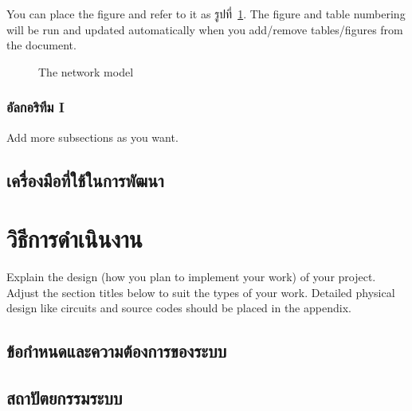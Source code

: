 \documentclass[12pt,oneside,openright,a4paper]{cpe-thai-project}
\begin{document}
You can place the figure and refer to it as รูปที่~\ref{fig:model2}.
The figure and table numbering will be run and updated automatically when you add/remove tables/figures from the document.

\begin{figure}[!h]\centering
\setlength{\fboxrule}{0.2mm} %
\setlength{\fboxsep}{1cm}
\caption{The network model}\label{fig:model2}
\end{figure}

 
\subsection{อัลกอริทึม I}
Add more subsections as you want.


\section{เครื่องมือที่ใช้ในการพัฒนา}

\chapter{วิธีการดำเนินงาน}

Explain the design (how you plan to implement your work) of your project. Adjust the section titles below to suit the types of your work. Detailed physical design like circuits and source codes should be placed in the appendix.

\section{ข้อกำหนดและความต้องการของระบบ}

\section{สถาปัตยกรรมระบบ}
\end{document}
